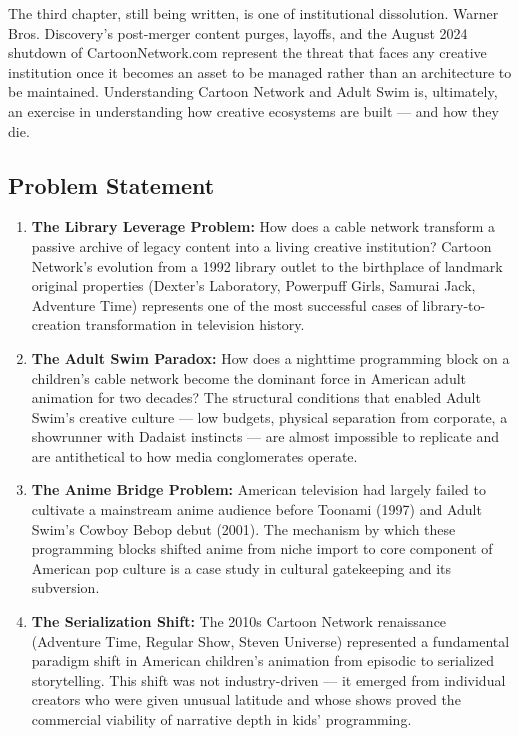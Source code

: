 \documentclass[11pt,letterpaper]{article}
\begin{document}
The third chapter, still being written, is one of institutional dissolution. Warner Bros. Discovery's post-merger content purges, layoffs, and the August 2024 shutdown of CartoonNetwork.com represent the threat that faces any creative institution once it becomes an asset to be managed rather than an architecture to be maintained. Understanding Cartoon Network and Adult Swim is, ultimately, an exercise in understanding how creative ecosystems are built --- and how they die.

\subsection{Problem Statement}

\begin{enumerate}
  \item \textbf{The Library Leverage Problem:} How does a cable network transform a passive archive of legacy content into a living creative institution? Cartoon Network's evolution from a 1992 library outlet to the birthplace of landmark original properties (Dexter's Laboratory, Powerpuff Girls, Samurai Jack, Adventure Time) represents one of the most successful cases of library-to-creation transformation in television history.

  \item \textbf{The Adult Swim Paradox:} How does a nighttime programming block on a children's cable network become the dominant force in American adult animation for two decades? The structural conditions that enabled Adult Swim's creative culture --- low budgets, physical separation from corporate, a showrunner with Dadaist instincts --- are almost impossible to replicate and are antithetical to how media conglomerates operate.

  \item \textbf{The Anime Bridge Problem:} American television had largely failed to cultivate a mainstream anime audience before Toonami (1997) and Adult Swim's Cowboy Bebop debut (2001). The mechanism by which these programming blocks shifted anime from niche import to core component of American pop culture is a case study in cultural gatekeeping and its subversion.

  \item \textbf{The Serialization Shift:} The 2010s Cartoon Network renaissance (Adventure Time, Regular Show, Steven Universe) represented a fundamental paradigm shift in American children's animation from episodic to serialized storytelling. This shift was not industry-driven --- it emerged from individual creators who were given unusual latitude and whose shows proved the commercial viability of narrative depth in kids' programming.


\end{enumerate}
\end{document}

